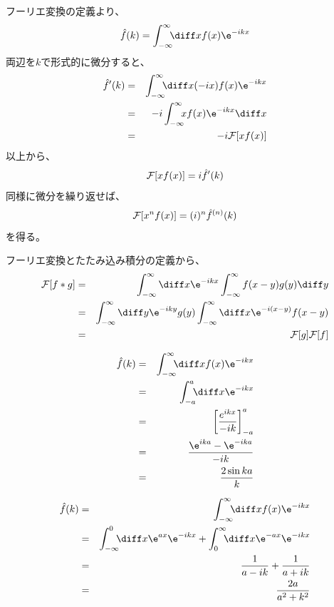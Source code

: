 フーリエ変換の定義より、
\begin{equation}
  \hat{f}(k) = \int_{-\infty}^{\infty} \!\!\! \diff x f(x) \e^{-ikx}
\end{equation}
両辺を$k$で形式的に微分すると、
\begin{eqnarray}
  \hat{f}'(k) &=& \int_{-\infty}^{\infty} \!\!\! \diff x (-ix) f(x) \e^{-ikx}\\
  &=& -i \int_{-\infty}^{\infty} \!\!\! x f(x) \e^{-ikx} \diff x\\
  &=& -i {\cal F}[x f(x)]
\end{eqnarray}
以上から、
\begin{equation}
  {\cal F}[x f(x)] = i \hat{f}'(k)
\end{equation}
同様に微分を繰り返せば、
\begin{equation}
  {\cal F}[x^n f(x)] = (i)^n \hat{f}^{(n)}(k)
\end{equation}
を得る。

フーリエ変換とたたみ込み積分の定義から、
\begin{eqnarray}
  {\cal F}[f*g] &=& \int_{-\infty}^{\infty} \diff x \e^{-ikx} \int_{-\infty}^{\infty} f(x-y)g(y)\diff y \\
  &=& \int_{-\infty}^{\infty} \diff y \e^{-iky} g(y) \int_{-\infty}^{\infty} \diff x \e^{-i(x-y)} f(x-y)\\
  &=& {\cal F}[g] {\cal F}[f]
\end{eqnarray}


\begin{eqnarray}
  \hat{f}(k) &=& \int_{-\infty}^{\infty} \!\!\! \diff x f(x) \e^{-ikx} \\
  &=& \int_{-a}^{a} \!\!\! \diff x \e^{-ikx} \\
  &=&
  \left[
    \frac{e^{ikx}}{-ik}
    \right]_{-a}^{a}\\
  &=& \frac{\e^{ika}-\e^{-ika}}{-ik}\\
  &=& \frac{2\sin ka}{k}
\end{eqnarray}

\begin{eqnarray}
  \hat{f}(k) &=& \int_{-\infty}^{\infty} \!\!\! \diff x f(x) \e^{-ikx} \\
  &=&
  \int_{-\infty}^{0} \!\!\! \diff x \e^{ax} \e^{-ikx}+
  \int_{0}^{\infty} \!\!\! \diff x \e^{-ax} \e^{-ikx}\\
  &=& \frac{1}{a-ik} + \frac{1}{a+ik} \\
  &=& \frac{2a}{a^2+k^2}
\end{eqnarray}

